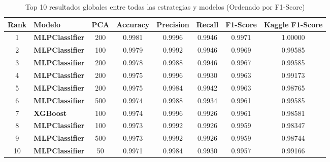 \documentclass{article}
\begin{document}
\begin{table}[H]
    \centering
    \begin{tabular}{|c|l|c|c|c|c|c|c|}
    \hline
    \rowcolor{tableblue} \textbf{Rank} & \textbf{Modelo} & \textbf{PCA} & \textbf{Accuracy} & \textbf{Precision} & \textbf{Recall} & \textbf{F1-Score} & \textbf{Kaggle F1-Score} \\
    \hline
    \rowcolor{purple!30} 1 & \textbf{MLPClassifier} & 200 & 0.9981 & 0.9996 & 0.9946 & 0.9971 & 1.00000 \\
    \hline
    \rowcolor{blue!20} 2 & \textbf{MLPClassifier} & 100 & 0.9979 & 0.9992 & 0.9946 & 0.9969 & 0.99585 \\
    \hline
    \rowcolor{purple!30} 3 & \textbf{MLPClassifier} & 200 & 0.9978 & 0.9988 & 0.9946 & 0.9967 & 0.99585 \\
    \hline
    \rowcolor{purple!30} 4 & \textbf{MLPClassifier} & 200 & 0.9975 & 0.9996 & 0.9930 & 0.9963 & 0.99173 \\
    \hline
    \rowcolor{purple!30} 5 & \textbf{MLPClassifier} & 200 & 0.9975 & 0.9984 & 0.9942 & 0.9963 & 0.98765 \\
    \hline
    \rowcolor{green!20} 6 & \textbf{MLPClassifier} & 500 & 0.9974 & 0.9988 & 0.9934 & 0.9961 & 0.99585 \\
    \hline
    \rowcolor{yellow!60} 7 & \textbf{XGBoost} & 100 & 0.9974 & 0.9996 & 0.9926 & 0.9961 & 0.98581 \\
    \hline
    \rowcolor{blue!20} 8 & \textbf{MLPClassifier} & 100 & 0.9973 & 0.9992 & 0.9926 & 0.9959 & 0.98347 \\
    \hline
    \rowcolor{green!20} 9 & \textbf{MLPClassifier} & 500 & 0.9973 & 0.9992 & 0.9926 & 0.9959 & 0.98744 \\
    \hline
    \rowcolor{orange!40} 10 & \textbf{MLPClassifier} & 50 & 0.9971 & 0.9984 & 0.9930 & 0.9957 & 0.99166 \\
    \hline
    \end{tabular}
    \caption{Top 10 resultados globales entre todas las estrategias y modelos (Ordenado por F1-Score)}
    \label{tab:top10_globales}
\end{table}
\end{document}
